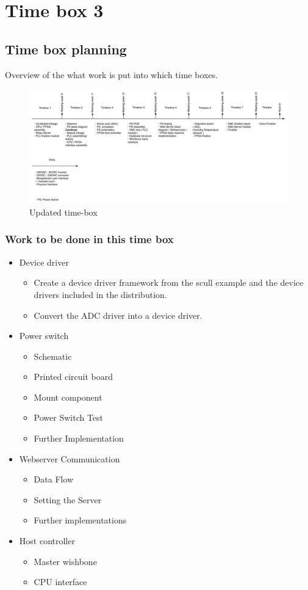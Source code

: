\section{Time box 3}
\subsection{Time box planning}
Overview of the what work is put into which time boxes.
\begin{figure}[H]
	\begin{centering}
		 \includegraphics[width=1.0\textwidth]{images/tb_r3.pdf}
		\caption{Updated time-box}
	\end{centering}
\end{figure}

\subsubsection{Work to be done in this time box}
\begin{itemize}
	\item Device driver
	\begin{itemize}
		\item Create a device driver framework from the scull example and the device drivers included in the distribution. 
		\item Convert the ADC driver into a device driver.
	\end{itemize}
	\item Power switch
	\begin{itemize}
		\item Schematic
		\item Printed circuit board
		\item Mount component
		\item Power Switch Test
		\item Further Implementation
	\end{itemize}
	\item{Webserver Communication}
	\begin{itemize}
		\item Data Flow
		\item Setting the Server
		\item Further implementations
	\end{itemize}
	\item Host controller
	\begin{itemize}
		\item Master wishbone
		\item CPU interface
	\end{itemize}
\end{itemize}
